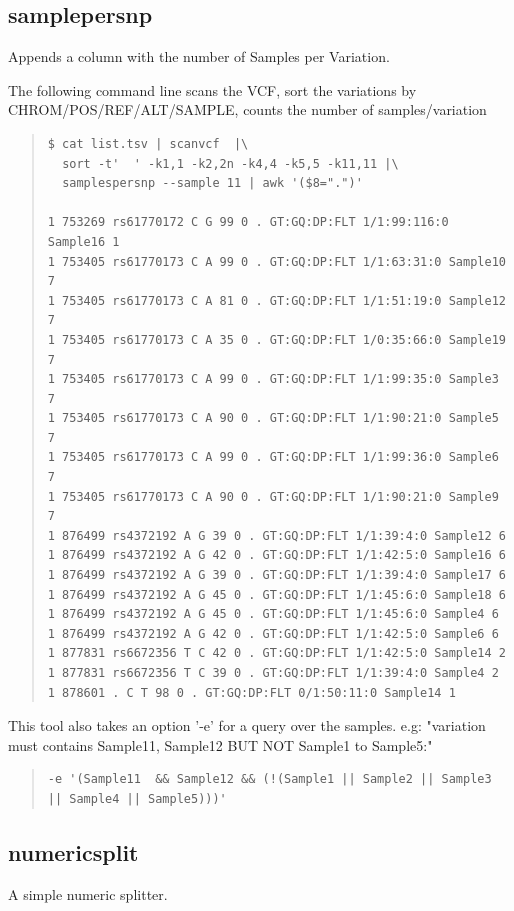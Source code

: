 \documentclass[12pt]{article}
\begin{document}
\subsection{samplepersnp}
Appends a column with the number of Samples per Variation.

The following command line scans the VCF, sort the variations by CHROM/POS/REF/ALT/SAMPLE, counts the number of samples/variation 

\begin{quote}
\begin{verbatim}
$ cat list.tsv | scanvcf  |\
  sort -t'  ' -k1,1 -k2,2n -k4,4 -k5,5 -k11,11 |\
  samplespersnp --sample 11 | awk '($8=".")'

1 753269 rs61770172 C G 99 0 . GT:GQ:DP:FLT 1/1:99:116:0 Sample16 1
1 753405 rs61770173 C A 99 0 . GT:GQ:DP:FLT 1/1:63:31:0 Sample10 7
1 753405 rs61770173 C A 81 0 . GT:GQ:DP:FLT 1/1:51:19:0 Sample12 7
1 753405 rs61770173 C A 35 0 . GT:GQ:DP:FLT 1/0:35:66:0 Sample19 7
1 753405 rs61770173 C A 99 0 . GT:GQ:DP:FLT 1/1:99:35:0 Sample3 7
1 753405 rs61770173 C A 90 0 . GT:GQ:DP:FLT 1/1:90:21:0 Sample5 7
1 753405 rs61770173 C A 99 0 . GT:GQ:DP:FLT 1/1:99:36:0 Sample6 7
1 753405 rs61770173 C A 90 0 . GT:GQ:DP:FLT 1/1:90:21:0 Sample9 7
1 876499 rs4372192 A G 39 0 . GT:GQ:DP:FLT 1/1:39:4:0 Sample12 6
1 876499 rs4372192 A G 42 0 . GT:GQ:DP:FLT 1/1:42:5:0 Sample16 6
1 876499 rs4372192 A G 39 0 . GT:GQ:DP:FLT 1/1:39:4:0 Sample17 6
1 876499 rs4372192 A G 45 0 . GT:GQ:DP:FLT 1/1:45:6:0 Sample18 6
1 876499 rs4372192 A G 45 0 . GT:GQ:DP:FLT 1/1:45:6:0 Sample4 6
1 876499 rs4372192 A G 42 0 . GT:GQ:DP:FLT 1/1:42:5:0 Sample6 6
1 877831 rs6672356 T C 42 0 . GT:GQ:DP:FLT 1/1:42:5:0 Sample14 2
1 877831 rs6672356 T C 39 0 . GT:GQ:DP:FLT 1/1:39:4:0 Sample4 2
1 878601 . C T 98 0 . GT:GQ:DP:FLT 0/1:50:11:0 Sample14 1
\end{verbatim}
\end{quote}

This tool also takes an option '-e' for a query over the samples. e.g: "variation must contains Sample11, Sample12 BUT NOT Sample1 to Sample5:"
\begin{quote}
\begin{verbatim}
-e '(Sample11  && Sample12 && (!(Sample1 || Sample2 || Sample3 || Sample4 || Sample5)))'
\end{verbatim}
\end{quote}

\subsection{numericsplit}
A simple numeric splitter.
\end{document}
